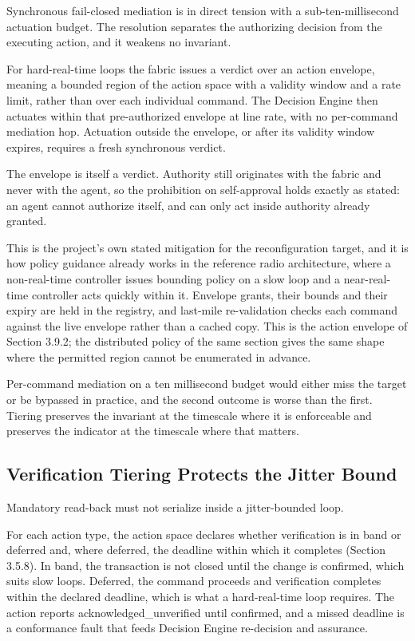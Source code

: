 Synchronous fail-closed mediation is in direct tension with a
sub-ten-millisecond actuation budget. The resolution separates the
authorizing decision from the executing action, and it weakens no
invariant.

For hard-real-time loops the fabric issues a verdict over an action
envelope, meaning a bounded region of the action space with a validity
window and a rate limit, rather than over each individual command. The
Decision Engine then actuates within that pre-authorized envelope at
line rate, with no per-command mediation hop. Actuation outside the
envelope, or after its validity window expires, requires a fresh
synchronous verdict.

The envelope is itself a verdict. Authority still originates with the
fabric and never with the agent, so the prohibition on self-approval
holds exactly as stated: an agent cannot authorize itself, and can only
act inside authority already granted.

This is the project's own stated mitigation for the reconfiguration
target, and it is how policy guidance already works in the reference
radio architecture, where a non-real-time controller issues bounding
policy on a slow loop and a near-real-time controller acts quickly
within it. Envelope grants, their bounds and their expiry are held in
the registry, and last-mile re-validation checks each command against
the live envelope rather than a cached copy. This is the action envelope
of Section 3.9.2; the distributed policy of the same section gives the
same shape where the permitted region cannot be enumerated in advance.

Per-command mediation on a ten millisecond budget would either miss the
target or be bypassed in practice, and the second outcome is worse than
the first. Tiering preserves the invariant at the timescale where it is
enforceable and preserves the indicator at the timescale where that
matters.

\hypertarget{verification-tiering-protects-the-jitter-bound}{%
\subsection{Verification Tiering Protects the Jitter Bound}\label{verification-tiering-protects-the-jitter-bound}}

Mandatory read-back must not serialize inside a jitter-bounded loop.

For each action type, the action space declares whether verification is
in band or deferred and, where deferred, the deadline within which it
completes (Section 3.5.8). In band, the transaction is not closed until
the change is confirmed, which suits slow loops. Deferred, the command
proceeds and verification completes within the declared deadline, which
is what a hard-real-time loop requires. The action reports
acknowledged\_\allowbreak{}unverified until confirmed, and a missed
deadline is a conformance fault that feeds Decision Engine re-decision
and assurance.

